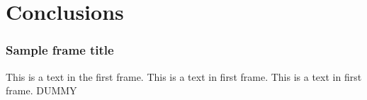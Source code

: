 \section{Conclusions}
\label{sec:conclusions}

\begin{frame}
  \frametitle{Sample frame title}
  This is a text in the first frame. This is a text in first frame. This is a
  text in first frame. DUMMY
\end{frame}
